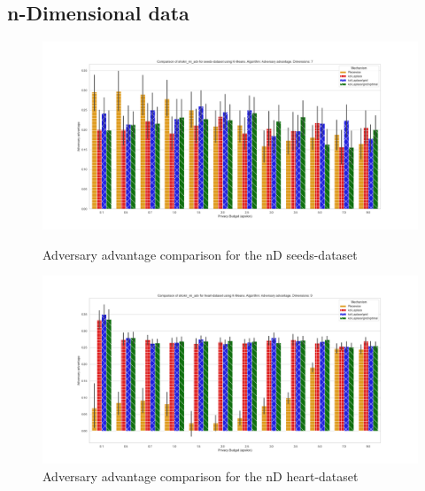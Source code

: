 {    \subsection{n-Dimensional data}
    \begin{figure}[H]
        \centering
        \begin{minipage}[c]{0.8\textwidth}
            \includegraphics[width=1\textwidth]{Results/RQ2-nd/seeds-dataset/shokri_mi_adv_seeds-dataset_comparison.png}
            \caption{Adversary advantage comparison for the nD seeds-dataset}
            \label{fig:appendix-mi_seeds-dataset_comparison_nd}
        \end{minipage}
        \begin{minipage}[c]{0.8\textwidth}
            \includegraphics[width=1\textwidth]{Results/RQ2-nd/heart-dataset/shokri_mi_adv_heart-dataset_comparison.png}
            \caption{Adversary advantage comparison for the nD heart-dataset}
            \label{fig:appendix-mi_heart-dataset_comparison_nd}
        \end{minipage}

    \end{figure}}
